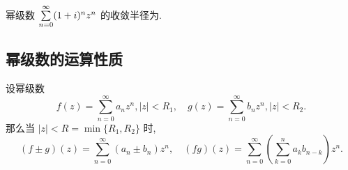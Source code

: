 \begin{exercise}
	幂级数 $\sum\limits_{n=0}^\infty(1+i)^nz^n$ 的收敛半径为.
\end{exercise}

% 
% 
% 

% 
% 

% 

\subsection{幂级数的运算性质}

\begin{theorem}
	设幂级数
	\[f(z)=\sum_{n=0}^\infty a_nz^n,|z|<R_1,\quad
	g(z)=\sum_{n=0}^\infty b_nz^n,|z|<R_2.\]
	{那么当 $|z|<R=\min\{R_1,R_2\}$ 时,
	\[(f\pm g)(z)=\sum_{n=0}^\infty (a_n\pm b_n)z^n,\quad
	(fg)(z)=\sum_{n=0}^\infty\left(\sum_{k=0}^na_kb_{n-k}\right)z^n.\]}
\end{theorem}

